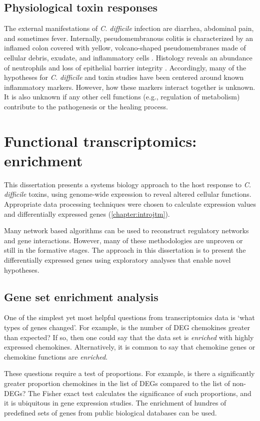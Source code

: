\subsection{Physiological toxin responses}
The external manifestations of \textit{C. difficile} infection 
are diarrhea, abdominal pain, and sometimes fever.
Internally, pseudomembranous colitis is characterized by
an inflamed colon covered with yellow, volcano-shaped 
pseudomembranes made of cellular debris, exudate,
and inflammatory cells \cite{Tedesco:1974jo}. 
Histology reveals an abundance of neutrophils and
loss of epithelial barrier integrity \cite{Lyerly:1988dk,Kelly:1994cu}.
Accordingly, many of the hypotheses for \textit{C. difficile}
and toxin studies have been centered around known inflammatory
markers. However, how these markers interact together
is unknown. It is also unknown if any other cell functions
(e.g., regulation of metabolism) contribute to the pathogenesis
or the healing process.


\section{Functional transcriptomics: enrichment}
This dissertation presents a systems biology approach
to the host response to \textit{C. difficile} toxins,
using genome-wide expression to reveal altered cellular functions.
Appropriate data processing techniques were chosen to calculate
expression values and differentially expressed genes (\autoref{chapter:introjtm}).

Many network based algorithms can be used to reconstruct regulatory networks
and gene interactions. However, many of these methodologies are unproven
or still in the formative stages. The approach in this dissertation
is to present the differentially expressed genes using exploratory analyses
that enable novel hypotheses.

\subsection{Gene set enrichment analysis}
One of the simplest yet most helpful questions from transcriptomics data is `what
types of genes changed'. For example, is the number of DEG chemokines 
greater than expected? If so, then one could say that the data
set is \textit{enriched} with highly expressed chemokines. Alternatively,
it is common to say that chemokine genes or chemokine functions
are \textit{enriched}.

These questions require a test of proportions. For example,
is there a significantly greater proportion chemokines in the list
of DEGs compared to the list of non-DEGs?
The Fisher exact test calculates the significance of such proportions, and it
is ubiquitous in gene expression studies. The enrichment of hundres
of predefined sets of genes from public biological databases can be used.

